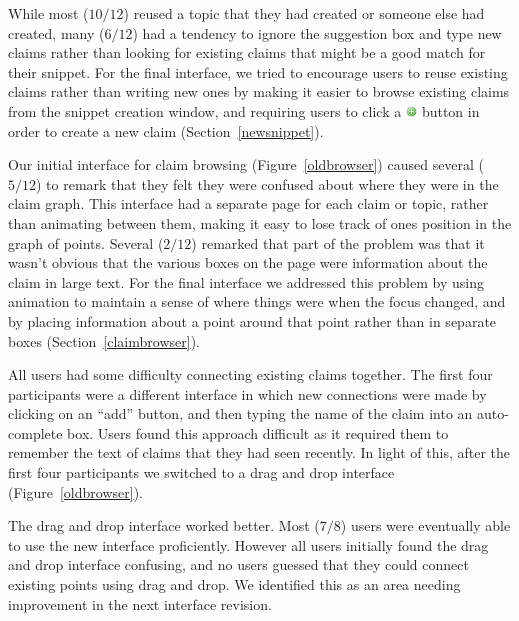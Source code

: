 \documentclass{chi2009}
\begin{document}
While most ($10/12$) reused a topic that they had created or someone else had created, many ($6/12$) had a tendency to ignore the suggestion box and type new claims rather than looking for existing claims that might be a good match for their snippet. For the final interface, we tried to encourage users to reuse existing claims rather than writing new ones by making it easier to browse existing claims from the snippet creation window, and requiring users to click a \includegraphics[width=0.3cm]{../images/add.png} button in order to create a new claim (Section~\ref{newsnippet}). 

Our initial interface for claim browsing (Figure~\ref{oldbrowser}) caused several ($5/12$) to remark that they felt they were confused about where they were in the claim graph. This interface had a separate page for each claim or topic, rather than animating between them, making it easy to lose track of ones position in the graph of points. Several ($2/12$) remarked that part of the problem was that it wasn't obvious that the various boxes on the page were information about the claim in large text. For the final interface we addressed this problem by using animation to maintain a sense of where things were when the focus changed, and by placing information about a point around that point rather than in separate boxes (Section~\ref{claimbrowser}).

All users had some difficulty connecting existing claims together. The first four participants were a different interface in which new connections were made by clicking on an ``add'' button, and then typing the name of the claim into an auto-complete box. Users found this approach difficult as it required them to remember the text of claims that they had seen recently. In light of this, after the first four participants we switched to a drag and drop interface (Figure~\ref{oldbrowser}).

The drag and drop interface worked better. Most ($7/8$) users were eventually able to use the new interface proficiently. However all users initially found the drag and drop interface confusing, and no users guessed that they could connect existing points using drag and drop. We identified this as an area needing improvement in the next interface revision.
\end{document}
